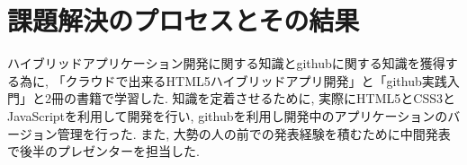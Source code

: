 \section{課題解決のプロセスとその結果}
ハイブリッドアプリケーション開発に関する知識とgithubに関する知識を獲得する為に,
「クラウドで出来るHTML5ハイブリッドアプリ開発」\cite{monaca}と「github実践入門」\cite{github}と2冊の書籍で学習した.
知識を定着させるために, 実際にHTML5とCSS3とJavaScriptを利用して開発を行い,
githubを利用し開発中のアプリケーションのバージョン管理を行った.
また, 大勢の人の前での発表経験を積むために中間発表で後半のプレゼンターを担当した.
